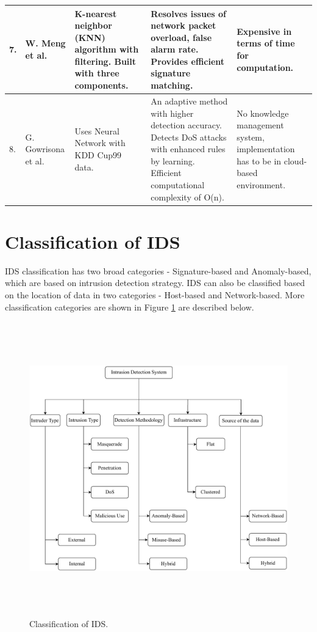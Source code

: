 \begin{longtable}[c]{|p{0.25in}|p{0.75in}|p{1.5in}|p{1.5in}|p{1.5in}|}
7. & W. Meng et al. \cite{meng2014efm} & K-nearest neighbor (KNN) algorithm with filtering. Built with three components. & Resolves issues of network packet overload, false alarm rate. Provides efficient signature matching. & Expensive in terms of time for computation. \\ \hline
8. & G. Gowrisona et al. \cite{gowrison2013minimal} & Uses Neural Network with KDD Cup99 data. & An adaptive method with higher detection accuracy. Detects DoS attacks with enhanced rules by learning. Efficient computational complexity of O(n). & No knowledge management system, implementation has to be in cloud-based environment. \\ \hline
\end{longtable}

\section{Classification of IDS}
IDS classification has two broad categories - Signature-based and Anomaly-based, which are based on intrusion detection strategy. IDS can also be classified based on the location of data in two categories - Host-based and Network-based. More classification categories are shown in Figure \ref{IDS-Classification} \cite{alrajeh2013intrusion, farooqi2009intrusion} are described below.

\begin{figure}[ht]
\center	
\includegraphics[width=\textwidth, height=5in] {Figures/PDF/IDS_Classification.pdf}
\caption{Classification of IDS.}
\label{IDS-Classification}	
\end{figure}

